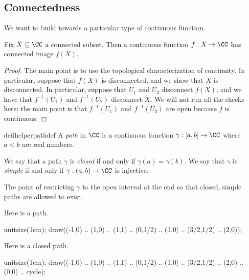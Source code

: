 \subsection{Connectedness}
We want to build towards a particular type of continuous function.
\begin{proposition}
	Fix $X\subseteq\CC$ a connected subset. Then a continuous function $f:X\to\CC$ has connected image $f(X)$.
\end{proposition}
\begin{proof}
	The main point is to use the topological characterization of continuity. In particular, suppose that $f(X)$ is disconnected, and we show that $X$ is disconnected. In particular, suppose that $U_1$ and $U_2$ disconnect $f(X)$, and we have that $f^{-1}(U_1)$ and $f^{-1}(U_2)$ disconnect $X$. We will not run all the checks here; the main point is that $f^{-1}(U_1)$ and $f^{-1}(U_2)$ are open because $f$ is continuous.
\end{proof}
\begin{restatable}[Path]{defihelper}{pathdef} 
	A \textit{path} in $\CC$ is a continuous function $\gamma:[a,b]\to\CC$ where $a<b$ are real numbers.
\end{restatable}
\begin{definition}
	We say that a path $\gamma$ is \textit{closed} if and only if $\gamma(a)=\gamma(b)$. We say that $\gamma$ is \textit{simple} if and only if $\gamma:(a,b)\to\CC$ is injective.
\end{definition}
\begin{remark}
	The point of restricting $\gamma$ to the open interval at the end so that closed, simple paths are allowed to exist.
\end{remark}
\begin{example}
	Here is a path.
	\begin{center}
		\begin{asy}
			unitsize(1cm);
			draw((-1,0) .. (1,0) .. (1,1) .. (0,1/2) .. (1,0) .. (3/2,1/2) .. (2,0));
		\end{asy}
	\end{center}
\end{example}
\begin{example}
	Here is a closed path.
	\begin{center}
		\begin{asy}
			unitsize(1cm);
			draw((-1,0) .. (1,0) .. (1,1) .. (0,1/2) .. (1,0) .. (3/2,1/2) .. (2,0) .. (0,0) .. cycle);
		\end{asy}
	\end{center}
\end{example}
